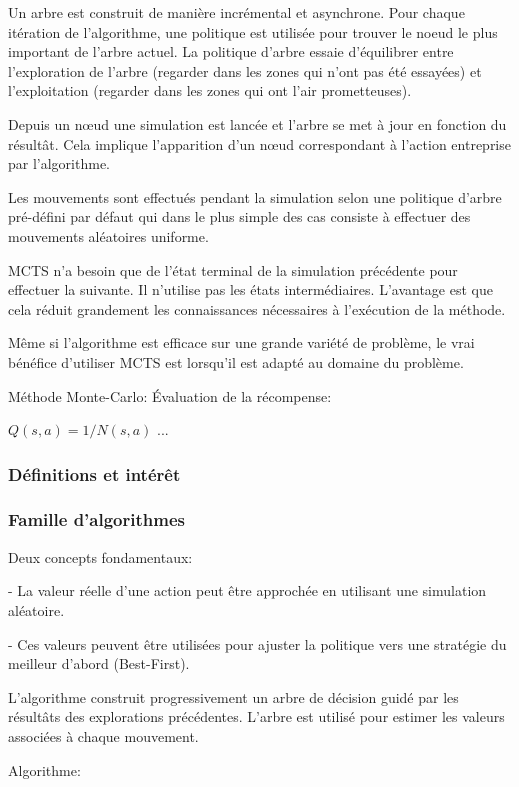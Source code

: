 Un arbre est construit de manière incrémental et asynchrone. Pour chaque itération de l'algorithme, une politique est utilisée pour trouver le noeud le plus important de l'arbre actuel.
La politique d'arbre essaie d'équilibrer entre l'exploration de l'arbre (regarder dans les zones qui n'ont pas été essayées) et l'exploitation (regarder dans les zones qui ont l'air prometteuses).

Depuis un nœud une simulation est lancée et l'arbre se met à jour en fonction du résultât. Cela implique l'apparition d'un nœud correspondant à l'action entreprise par l'algorithme.

Les mouvements sont effectués pendant la simulation selon une politique d'arbre pré-défini par défaut qui dans le plus simple des cas consiste à effectuer des mouvements aléatoires uniforme.

MCTS n'a besoin que de l'état terminal de la simulation précédente pour effectuer la suivante. Il n'utilise pas les états intermédiaires.
L'avantage est que cela réduit grandement les connaissances nécessaires à l'exécution de la méthode.

Même si l'algorithme est efficace sur une grande variété de problème, le vrai bénéfice d'utiliser MCTS est lorsqu'il est adapté au domaine du problème.

Méthode Monte-Carlo:
Évaluation de la récompense: 

$Q(s, a) = 1 / N(s, a)$ ... %

\subsubsection{Définitions et intérêt}

\subsubsection{Famille d'algorithmes}
Deux concepts fondamentaux:

- La valeur réelle d'une action peut être approchée en utilisant une simulation aléatoire.

- Ces valeurs peuvent être utilisées pour ajuster la politique vers une stratégie du meilleur d'abord (Best-First).

L'algorithme construit progressivement un arbre de décision guidé par les résultâts des explorations précédentes.
L'arbre est utilisé pour estimer les valeurs associées à chaque mouvement.

Algorithme: 


